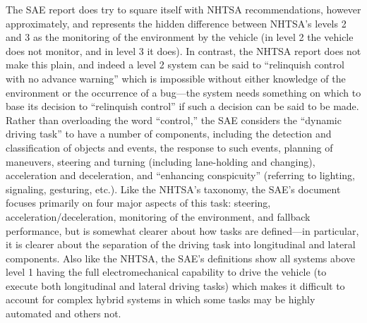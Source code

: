 The SAE report does try to square itself with NHTSA recommendations,
however approximately, and represents the hidden difference between
NHTSA's levels 2 and 3 as the monitoring of the environment by the
vehicle (in level 2 the vehicle does not monitor, and in level 3 it
does). In contrast, the NHTSA report does not make this plain, and
indeed a level 2 system can be said to ``relinquish control with no
advance warning'' which is impossible without either knowledge of the
environment or the occurrence of a bug—the system needs something on
which to base its decision to “relinquish control” if such a decision
can be said to be made.\cite{???} Rather than overloading the word ``control,''
the SAE considers the ``dynamic driving task'' to have a number of
components, including the detection and classification of objects and
events, the response to such events, planning of maneuvers, steering
and turning (including lane-holding and changing), acceleration and
deceleration, and ``enhancing conspicuity'' (referring to lighting,
signaling, gesturing, etc.).\cite{???} Like the NHTSA's taxonomy, the SAE's
document focuses primarily on four major aspects of this task:
steering, acceleration/deceleration, monitoring of the environment,
and fallback performance, but is somewhat clearer about how tasks are
defined—in particular, it is clearer about the separation of the
driving task into longitudinal and lateral components. Also like the
NHTSA, the SAE's definitions show all systems above level 1 having the
full electromechanical capability to drive the vehicle (to execute
both longitudinal and lateral driving tasks) which makes it difficult
to account for complex hybrid systems in which some tasks may be
highly automated and others not.

